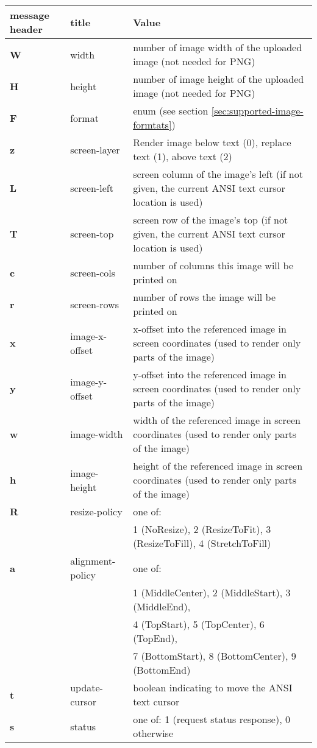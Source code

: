 \documentclass[a4paper]{article}
\begin{document}
\begin{tabular}{|m{3cm}|m{2cm}|m{11cm}|}
    \hline
    \textbf{message header}   & \textbf{title}   & \textbf{Value} \\
    \hline
    \textbf{W} & width            & number of image width of the uploaded image (not needed for PNG) \\
    \textbf{H} & height           & number of image height of the uploaded image (not needed for PNG) \\
    \textbf{F} & format           & enum (see section \ref{sec:supported-image-formtats}) \\
    \hline
    \textbf{z} & screen-layer     & Render image below text (0), replace text (1), above text (2) \\
    \textbf{L} & screen-left      & screen column of the image's left (if not given, the current ANSI text cursor location is used) \\
    \textbf{T} & screen-top       & screen row of the image's top (if not given, the current ANSI text cursor location is used) \\
    \textbf{c} & screen-cols      & number of columns this image will be printed on \\
    \textbf{r} & screen-rows      & number of rows the image will be printed on \\
    \textbf{x} & image-x-offset   & x-offset into the referenced image in screen coordinates (used to render only parts of the image) \\
    \textbf{y} & image-y-offset   & y-offset into the referenced image in screen coordinates (used to render only parts of the image) \\
    \textbf{w} & image-width      & width of the referenced image in screen coordinates (used to render only parts of the image) \\
    \textbf{h} & image-height     & height of the referenced image in screen coordinates (used to render only parts of the image) \\
    \textbf{R} & resize-policy    & one of: \\ %
               &                  & 1 (NoResize), 2 (ResizeToFit), 3 (ResizeToFill), 4 (StretchToFill) \\
    \textbf{a} & alignment-policy & one of: \\
               &                  & 1 (MiddleCenter), 2 (MiddleStart), 3 (MiddleEnd), \\
               &                  & 4 (TopStart), 5 (TopCenter), 6 (TopEnd), \\
               &                  & 7 (BottomStart), 8 (BottomCenter), 9 (BottomEnd) \\
    \textbf{t} & update-cursor    & boolean indicating to move the ANSI text cursor \\
    \textbf{s} & status           & one of: 1 (request status response), 0 otherwise \\
    \hline
\end{tabular}
\end{document}

